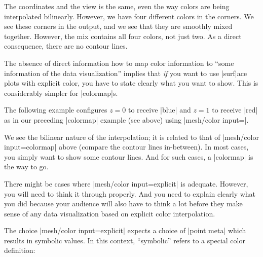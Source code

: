 {{\begin{codeexample}[]
\end{codeexample}
%
\noindent The coordinates and the view is the same, even the way colors are
being interpolated bilinearly. However, we have four different colors in the
corners. We see these corners in the output, and we see that they are smoothly
mixed together. However, the mix contains all four colors, not just two. As a
direct consequence, there are no contour lines.

The absence of direct information how to map color information to ``some
information of the data visualization'' implies that \emph{if} you want to use
|surf|ace plots with explicit color, you have to state clearly what you want to
show. This is considerably simpler for |colormap|s.

The following example configures $z=0$ to receive |blue| and $z=1$ to receive
|red| as in our preceding |colormap| example (see above) using
|mesh/color input=|.
%
\begin{codeexample}[]
\end{codeexample}
%
\noindent We see the bilinear nature of the interpolation; it is related to
that of |mesh/color input=colormap| above (compare the contour lines
in-between). In most cases, you simply want to show some contour lines. And for
such cases, a |colormap| is the way to go.

There might be cases where |mesh/color input=explicit| is adequate. However,
you will need to think it through properly. And you need to explain clearly
what you did because your audience will also have to think a lot before they
make sense of any data visualization based on explicit color interpolation.

The choice |mesh/color input=explicit| expects a choice of |point meta| which
results in symbolic values. In this context, ``symbolic'' refers to a special
color definition:
%
\begin{codeexample}[]
\end{codeexample}}}
